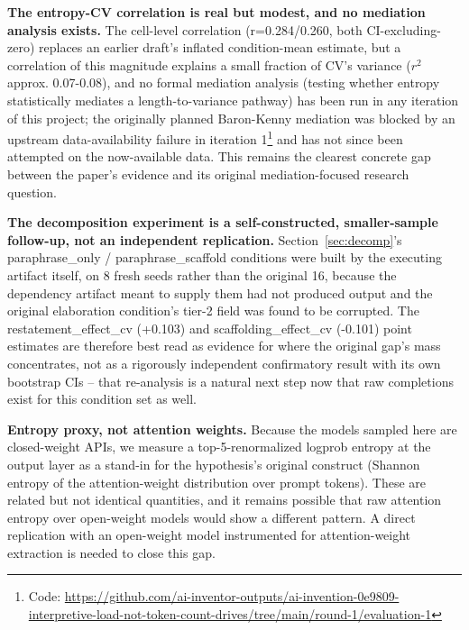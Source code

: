\documentclass[11pt,letterpaper]{article}
\begin{document}
\textbf{The entropy-CV correlation is real but modest, and no mediation analysis exists.} The cell-level correlation (r=0.284/0.260, both CI-excluding-zero) replaces an earlier draft's inflated condition-mean estimate, but a correlation of this magnitude explains a small fraction of CV's variance ($r^2$ approx. 0.07-0.08), and no formal mediation analysis (testing whether entropy statistically mediates a length-to-variance pathway) has been run in any iteration of this project; the originally planned Baron-Kenny mediation was blocked by an upstream data-availability failure in iteration 1\footnote{Code: \url{https://github.com/ai-inventor-outputs/ai-invention-0e9809-interpretive-load-not-token-count-drives/tree/main/round-1/evaluation-1}} and has not since been attempted on the now-available data. This remains the clearest concrete gap between the paper's evidence and its original mediation-focused research question.

\textbf{The decomposition experiment is a self-constructed, smaller-sample follow-up, not an independent replication.} Section~\ref{sec:decomp}'s paraphrase\_only / paraphrase\_scaffold conditions were built by the executing artifact itself, on 8 fresh seeds rather than the original 16, because the dependency artifact meant to supply them had not produced output and the original elaboration condition's tier-2 field was found to be corrupted. The restatement\_effect\_cv (+0.103) and scaffolding\_effect\_cv (-0.101) point estimates are therefore best read as evidence for where the original gap's mass concentrates, not as a rigorously independent confirmatory result with its own bootstrap CIs -- that re-analysis is a natural next step now that raw completions exist for this condition set as well.

\textbf{Entropy proxy, not attention weights.} Because the models sampled here are closed-weight APIs, we measure a top-5-renormalized logprob entropy at the output layer as a stand-in for the hypothesis's original construct (Shannon entropy of the attention-weight distribution over prompt tokens). These are related but not identical quantities, and it remains possible that raw attention entropy over open-weight models would show a different pattern. A direct replication with an open-weight model instrumented for attention-weight extraction is needed to close this gap.
\end{document}
